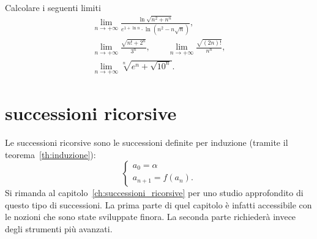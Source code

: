 \begin{exercise}
Calcolare i seguenti limiti
\begin{gather*}
  \lim_{n\to +\infty} \frac{\displaystyle \ln\sqrt{n^2+n^n}}
  {\displaystyle e^{1 + \ln n}\cdot \ln(n^2-n\sqrt n)}, \\
  \lim_{n\to +\infty} \frac{\sqrt{n! + 2^n}}{3^n}, \qquad
  \lim_{n\to +\infty} \frac{\sqrt{(2n)!}}{n^n}, \\
  \lim_{n\to +\infty} \sqrt[n]{e^n + \sqrt{10^n}}.
\end{gather*}
\end{exercise}

\section{successioni ricorsive}

Le successioni ricorsive sono le successioni
definite per induzione (tramite il teorema~\ref{th:induzione}):
\[
 \begin{cases}
   a_0 = \alpha \\
   a_{n+1} = f(a_n).
 \end{cases}
\]
Si rimanda al capitolo~\ref{ch:successioni_ricorsive}
per uno studio approfondito di questo tipo di successioni.
La prima parte di quel capitolo è infatti accessibile con le nozioni
che sono state sviluppate finora.
La seconda parte richiederà invece degli strumenti più avanzati.
